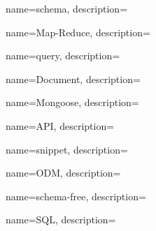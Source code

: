 {
	name=schema,
	description={\TODO{}}
}

 {
	name=Map-Reduce,
	description={\TODO{}}
}

 {
	name=query,
	description={\TODO{}}
}

 {
	name=Document,
	description={\TODO{}}
}

 {
	name=Mongoose,
	description={\TODO{}}
}

 {
	name=API,
	description={\TODO{}}
}

 {
	name=snippet,
	description={\TODO{}}
}

 {
	name=ODM,
	description={\TODO{}}
}

 {
	name=schema-free,
	description={\TODO{}}
}

 {
	name=SQL,
	description={\TODO{}}
}
